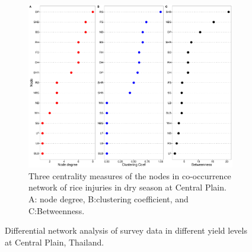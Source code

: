 \begin{figure}
\begin{subfigure}[b]{0.9\textwidth}
        \includegraphics[width = 1\textwidth]{figures/yield_dif_nodepropCentral_Plain.pdf}
        \caption[Three centrality measures of the nodes in co-occurrence network of rice injuries in dry season at Central Plain.]{Three centrality measures of the nodes in co-occurrence network of rice injuries in dry season at Central Plain. A: node degree, B:clustering coefficient, and C:Betweenness.}
        \label{fig:nodepropdifyield_CP}
    \end{subfigure}
    \caption{Differential network analysis of survey data in different yield levels at Central Plain, Thailand.}
    \label{fig:difyield_CP}
\end{figure}
 
